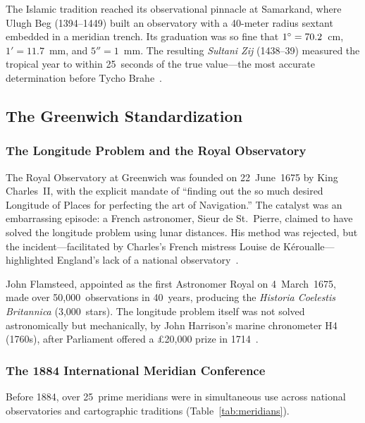\documentclass[10pt,a4paper]{article}
\begin{document}
The Islamic tradition reached its observational pinnacle at Samarkand, where
Ulugh Beg (1394--1449) built an observatory with a 40-meter radius sextant
embedded in a meridian trench. Its graduation was so fine that
$1\degree = 70.2$~cm, $1' = 11.7$~mm, and $5'' = 1$~mm. The resulting
\textit{Sultani Zij} (1438--39) measured the tropical year to within
25~seconds of the true value---the most accurate determination before
Tycho Brahe~\cite{sayili1960}.

\subsection{The Greenwich Standardization}
\label{subsec:greenwich}

\subsubsection{The Longitude Problem and the Royal Observatory}

The Royal Observatory at Greenwich was founded on 22~June~1675 by King
Charles~II, with the explicit mandate of ``finding out the so much desired
Longitude of Places for perfecting the art of Navigation.'' The catalyst
was an embarrassing episode: a French astronomer, Sieur de St.~Pierre,
claimed to have solved the longitude problem using lunar distances. His
method was rejected, but the incident---facilitated by Charles's French
mistress Louise de K\'{e}roualle---highlighted England's lack of a national
observatory~\cite{sobel1995}.

John Flamsteed, appointed as the first Astronomer Royal on 4~March~1675,
made over 50,000~observations in 40~years, producing the
\textit{Historia Coelestis Britannica} (3,000~stars). The longitude
problem itself was not solved astronomically but mechanically, by John
Harrison's marine chronometer H4 (1760s), after Parliament offered a
\pounds 20,000 prize in 1714~\cite{sobel1995}.

\subsubsection{The 1884 International Meridian Conference}

Before 1884, over 25~prime meridians were in simultaneous use across
national observatories and cartographic traditions (Table~\ref{tab:meridians}).
\end{document}

